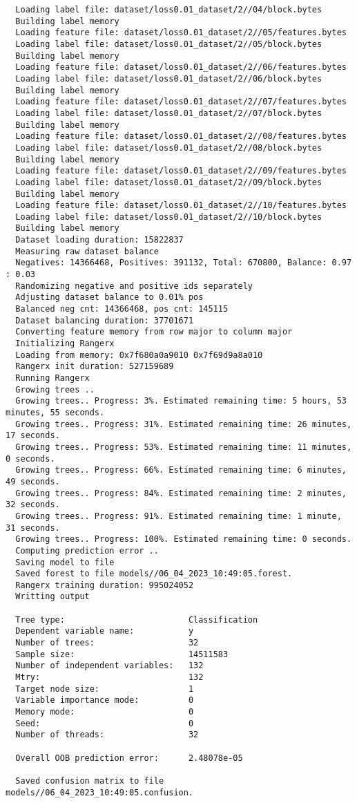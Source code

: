 \documentclass[12pt,oneside]{book}
\begin{document}
\begin{lstlisting}
  Loading label file: dataset/loss0.01_dataset/2//04/block.bytes
  Building label memory
  Loading feature file: dataset/loss0.01_dataset/2//05/features.bytes
  Loading label file: dataset/loss0.01_dataset/2//05/block.bytes
  Building label memory
  Loading feature file: dataset/loss0.01_dataset/2//06/features.bytes
  Loading label file: dataset/loss0.01_dataset/2//06/block.bytes
  Building label memory
  Loading feature file: dataset/loss0.01_dataset/2//07/features.bytes
  Loading label file: dataset/loss0.01_dataset/2//07/block.bytes
  Building label memory
  Loading feature file: dataset/loss0.01_dataset/2//08/features.bytes
  Loading label file: dataset/loss0.01_dataset/2//08/block.bytes
  Building label memory
  Loading feature file: dataset/loss0.01_dataset/2//09/features.bytes
  Loading label file: dataset/loss0.01_dataset/2//09/block.bytes
  Building label memory
  Loading feature file: dataset/loss0.01_dataset/2//10/features.bytes
  Loading label file: dataset/loss0.01_dataset/2//10/block.bytes
  Building label memory
  Dataset loading duration: 15822837
  Measuring raw dataset balance
  Negatives: 14366468, Positives: 391132, Total: 670800, Balance: 0.97 : 0.03
  Randomizing negative and positive ids separately
  Adjusting dataset balance to 0.01% pos
  Balanced neg cnt: 14366468, pos cnt: 145115
  Dataset balancing duration: 37701671
  Converting feature memory from row major to column major
  Initializing Rangerx
  Loading from memory: 0x7f680a0a9010 0x7f69d9a8a010
  Rangerx init duration: 527159689
  Running Rangerx
  Growing trees ..
  Growing trees.. Progress: 3%. Estimated remaining time: 5 hours, 53 minutes, 55 seconds.
  Growing trees.. Progress: 31%. Estimated remaining time: 26 minutes, 17 seconds.
  Growing trees.. Progress: 53%. Estimated remaining time: 11 minutes, 0 seconds.
  Growing trees.. Progress: 66%. Estimated remaining time: 6 minutes, 49 seconds.
  Growing trees.. Progress: 84%. Estimated remaining time: 2 minutes, 32 seconds.
  Growing trees.. Progress: 91%. Estimated remaining time: 1 minute, 31 seconds.
  Growing trees.. Progress: 100%. Estimated remaining time: 0 seconds.
  Computing prediction error ..
  Saving model to file
  Saved forest to file models//06_04_2023_10:49:05.forest.
  Rangerx training duration: 995024052
  Writting output
  
  Tree type:                         Classification
  Dependent variable name:           y
  Number of trees:                   32
  Sample size:                       14511583
  Number of independent variables:   132
  Mtry:                              132
  Target node size:                  1
  Variable importance mode:          0
  Memory mode:                       0
  Seed:                              0
  Number of threads:                 32
  
  Overall OOB prediction error:      2.48078e-05
  
  Saved confusion matrix to file models//06_04_2023_10:49:05.confusion.  
\end{lstlisting}
\end{document}
